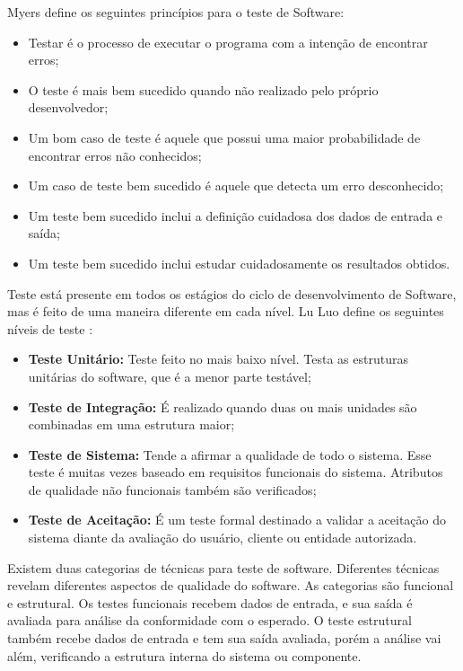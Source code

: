 Myers define os seguintes princípios para o teste de Software\cite{myers2011}:

\begin{itemize}
  \item Testar é o processo de executar o programa com a intenção de encontrar erros;
  \item O teste é mais bem sucedido quando não realizado pelo próprio desenvolvedor;
  \item Um bom caso de teste é aquele que possui uma maior probabilidade de encontrar erros não conhecidos;
  \item Um caso de teste bem sucedido é aquele que detecta um erro desconhecido;
  \item Um teste bem sucedido inclui a definição cuidadosa dos dados de entrada e saída;
  \item Um teste bem sucedido inclui estudar cuidadosamente os resultados obtidos.
\end{itemize}

Teste está presente em todos os estágios do ciclo de desenvolvimento de Software, mas é feito de uma maneira diferente em cada nível. Lu Luo define os seguintes níveis de teste \cite{luo2001}:

\begin{itemize}
  \item \textbf{Teste Unitário:} Teste feito no mais baixo nível. Testa as estruturas unitárias do software, que é a menor parte testável;
  \item \textbf{Teste de Integração:} É realizado quando duas ou mais unidades são combinadas em uma estrutura maior;
  \item \textbf{Teste de Sistema:} Tende a afirmar a qualidade de todo o sistema. Esse teste é muitas vezes baseado em requisitos funcionais do sistema. Atributos de qualidade não funcionais também são verificados;
  \item \textbf{Teste de Aceitação:} É um teste formal destinado a validar a aceitação do sistema diante da avaliação do usuário, cliente ou entidade autorizada.
\end{itemize}

Existem duas categorias de técnicas para teste de software. Diferentes técnicas revelam diferentes aspectos de qualidade do software. As categorias são funcional e estrutural. Os testes funcionais recebem dados de entrada, e sua saída é avaliada para análise da conformidade com o esperado. O teste estrutural também recebe dados de entrada e tem sua saída avaliada, porém a análise vai além, verificando a estrutura interna do sistema ou componente\cite{luo2001}.

